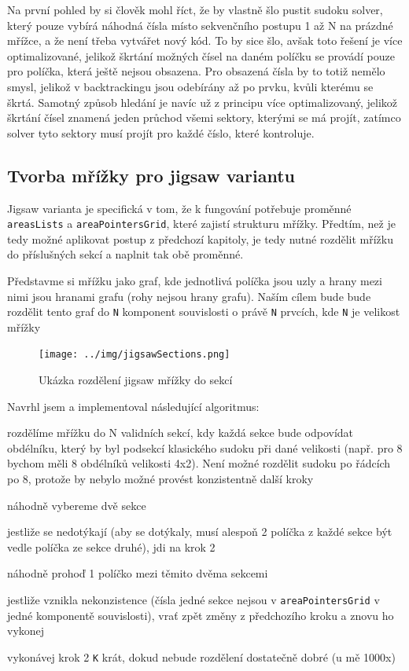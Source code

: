 \documentclass[a4paper,oneside,12pt]{report}
\begin{document}
Na první pohled by si člověk mohl říct, že by vlastně šlo pustit sudoku solver, který pouze vybírá náhodná čísla místo sekvenčního postupu 1 až N na prázdné mřížce, a že není třeba vytvářet nový kód. To by sice šlo, avšak toto řešení je více optimalizované, jelikož škrtání možných čísel na daném políčku se provádí pouze pro políčka, která ještě nejsou obsazena. Pro obsazená čísla by to totiž nemělo smysl, jelikož v backtrackingu jsou odebírány až po prvku, kvůli kterému se škrtá. Samotný způsob hledání je navíc už z principu více optimalizovaný, jelikož škrtání čísel znamená jeden průchod všemi sektory, kterými se má projít, zatímco solver tyto sektory musí projít pro každé číslo, které kontroluje.

\subsection{Tvorba mřížky pro jigsaw variantu}
Jigsaw varianta je specifická v tom, že k fungování potřebuje proměnné \texttt{areasLists} a \texttt{areaPointersGrid}, které zajistí strukturu mřížky. Předtím, než je tedy možné aplikovat postup z předchozí kapitoly, je tedy nutné rozdělit mřížku do příslušných sekcí a naplnit tak obě proměnné.

Představme si mřížku jako graf, kde jednotlivá políčka jsou uzly a hrany mezi nimi jsou hranami grafu (rohy nejsou hrany grafu). Naším cílem bude bude rozdělit tento graf do \texttt{N} komponent souvislosti o právě \texttt{N} prvcích, kde \texttt{N} je velikost mřížky

\begin{figure}[H]
  \centering
  \texttt{[image: ../img/jigsawSections.png]}
  \caption{Ukázka rozdělení jigsaw mřížky do sekcí}
  \label{fig:Ukázka rozdělení jigsaw mřížky do sekcí}
\end{figure}

Navrhl jsem a implementoval následující algoritmus: 
\begin{algEnumerate}
	\item rozdělíme mřížku do N validních sekcí, kdy každá sekce bude odpovídat obdélníku, který by byl podsekcí klasického sudoku při dané velikosti (např. pro 8 bychom měli 8 obdélníků velikosti 4x2). Není možné rozdělit sudoku po řádcích po 8, protože by nebylo možné provést konzistentně další kroky
	\item náhodně vybereme dvě sekce
	\item jestliže se nedotýkají (aby se dotýkaly, musí alespoň 2 políčka z každé sekce být vedle políčka ze sekce druhé), jdi na krok 2
	\item náhodně prohoď 1 políčko mezi těmito dvěma sekcemi
	\item jestliže vznikla nekonzistence (čísla jedné sekce nejsou v \texttt{areaPointersGrid} v jedné komponentě souvislosti), vrať zpět změny z předchozího kroku a znovu ho vykonej
	\item vykonávej krok 2 \texttt{K} krát, dokud nebude rozdělení dostatečně dobré (u mě 1000x)
\end{algEnumerate}
\end{document}
